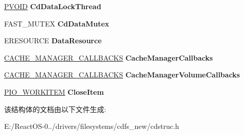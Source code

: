 \begin{DoxyCompactItemize}
\hyperlink{interfacevoid}{P\+V\+O\+ID} {\bfseries Cd\+Data\+Lock\+Thread}
\item 
\mbox{\label{struct___c_d___d_a_t_a_ae053ce84755d3bac3ec427776501ed96}} 
F\+A\+S\+T\+\_\+\+M\+U\+T\+EX {\bfseries Cd\+Data\+Mutex}
\item 
\mbox{\label{struct___c_d___d_a_t_a_a3380b369448f5860748c3d7e28fd2c1c}} 
E\+R\+E\+S\+O\+U\+R\+CE {\bfseries Data\+Resource}
\item 
\mbox{\label{struct___c_d___d_a_t_a_a0dddc9174630d9eb3df9edcad1891d7b}} 
\hyperlink{struct___c_a_c_h_e___m_a_n_a_g_e_r___c_a_l_l_b_a_c_k_s}{C\+A\+C\+H\+E\+\_\+\+M\+A\+N\+A\+G\+E\+R\+\_\+\+C\+A\+L\+L\+B\+A\+C\+KS} {\bfseries Cache\+Manager\+Callbacks}
\item 
\mbox{\label{struct___c_d___d_a_t_a_a7288dfb66f21a5e42a57b10bf3dbe117}} 
\hyperlink{struct___c_a_c_h_e___m_a_n_a_g_e_r___c_a_l_l_b_a_c_k_s}{C\+A\+C\+H\+E\+\_\+\+M\+A\+N\+A\+G\+E\+R\+\_\+\+C\+A\+L\+L\+B\+A\+C\+KS} {\bfseries Cache\+Manager\+Volume\+Callbacks}
\item 
\mbox{\label{struct___c_d___d_a_t_a_a90d83547aa091d712a1602bb8aeef951}} 
\hyperlink{struct___i_o___w_o_r_k_i_t_e_m}{P\+I\+O\+\_\+\+W\+O\+R\+K\+I\+T\+EM} {\bfseries Close\+Item}
\end{DoxyCompactItemize}


该结构体的文档由以下文件生成\+:\begin{DoxyCompactItemize}
\item 
E\+:/\+React\+O\+S-\/0../drivers/filesystems/cdfs\+\_\+new/cdstruc.\+h\end{DoxyCompactItemize}
